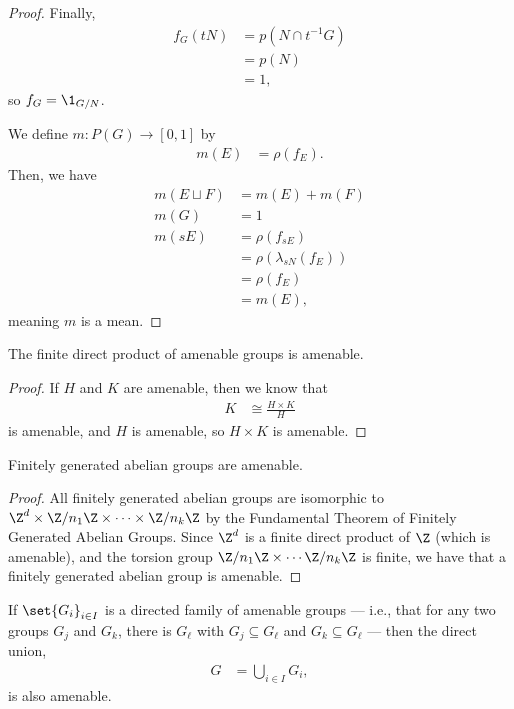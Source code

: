 \documentclass[10pt]{mypackage}
\begin{document}
\begin{proof}
  Finally,
  \begin{align*}
    f_G\left(tN\right) &= p\left(N\cap t^{-1}G\right)\\
                       &= p\left(N\right)\\
                       &= 1,
  \end{align*}
  so $f_{G} = \1_{G/N}$.\newline

  We define $m\colon P(G) \rightarrow [0,1]$ by
  \begin{align*}
    m(E) &= \rho\left(f_{E}\right).
  \end{align*}
  Then, we have
  \begin{align*}
    m\left(E\sqcup F\right) &= m\left(E\right) + m\left(F\right)\\
    m\left(G\right) &= 1\\
    m\left(sE\right) &= \rho\left(f_{sE}\right)\\
                     &= \rho\left(\lambda_{sN}\left(f_{E}\right)\right)\\
                     &= \rho\left(f_{E}\right)\\
                     &= m\left(E\right),
  \end{align*}
  meaning $m$ is a mean.
\end{proof}
\begin{corollary}
  The finite direct product of amenable groups is amenable.
\end{corollary}
\begin{proof}
  If $H$ and $K$ are amenable, then we know that
  \begin{align*}
    K &\cong \frac{H\times K}{H}
  \end{align*}
  is amenable, and $H$ is amenable, so $H\times K$ is amenable. 
\end{proof}
\begin{corollary}[]
  Finitely generated abelian groups are amenable.
\end{corollary}
\begin{proof}
  All finitely generated abelian groups are isomorphic to $\Z^{d}\times \Z/n_1\Z\times\cdots\times \Z/n_k\Z$ by the Fundamental Theorem of Finitely Generated Abelian Groups. Since $\Z^{d}$ is a finite direct product of $\Z$ (which is amenable), and the torsion group $\Z/n_1\Z\times\cdots \Z/n_k\Z$ is finite, we have that a finitely generated abelian group is amenable.
\end{proof}
\begin{corollary}
  If $\set{G_i}_{i\in I}$ is a directed family of amenable groups --- i.e., that for any two groups $G_j$ and $G_k$, there is $G_{\ell}$ with $G_j\subseteq G_{\ell}$ and $G_k\subseteq G_{\ell}$ --- then the direct union,
  \begin{align*}
    G &= \bigcup_{i\in I}G_i,
  \end{align*}
  is also amenable.
\end{corollary}
\end{document}
